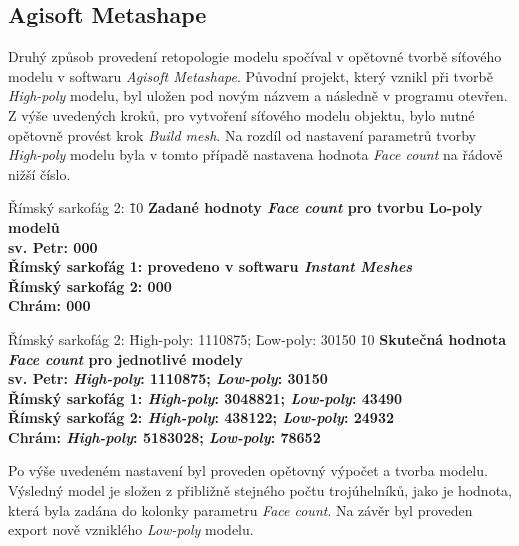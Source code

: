 \documentclass[a4paper, 12pt]{report}
\begin{document}
\subsection{Agisoft Metashape}
Druhý způsob provedení retopologie modelu spočíval v opětovné tvorbě síťového modelu v softwaru \textit{Agisoft Metashape}. Původní projekt, který vznikl při tvorbě \textit{High-poly} modelu, byl uložen pod novým názvem a následně v programu otevřen. Z výše uvedených kroků, pro vytvoření síťového modelu objektu, bylo nutné opětovně provést krok \textit{Build mesh}. Na rozdíl od nastavení parametrů tvorby \textit{High-poly} modelu byla v tomto případě nastavena hodnota \textit{Face count} na řádově nižší číslo. \\

\begin{tabbing}
    Římský sarkofág 2: \=      
    \= 10 \kill
    \bfseries Zadané hodnoty \textit{Face count} pro tvorbu Lo-poly modelů\> \\[1mm]
    sv. Petr:	 000\\
    Římský sarkofág 1:	\>	provedeno v softwaru \textit{Instant Meshes}\\
    Římský sarkofág 2:	 000\\
    Chrám:	 000\\
\end{tabbing}

\newpage
\begin{tabbing}
    Římský sarkofág 2: \=  High-poly: 1110875; \= Low-poly: 30150      
    \= 10 \kill
    \bfseries Skutečná hodnota \textit{Face count} pro jednotlivé modely\> \\[1mm]
    sv. Petr:	        \> \textit{High-poly}: 1110875;\> \textit{Low-poly}: 30150 \\
    Římský sarkofág 1:	\> \textit{High-poly}: 3048821;\> \textit{Low-poly}: 43490 \\
    Římský sarkofág 2:	\> \textit{High-poly}:  438122;\> \textit{Low-poly}: 24932 \\
    Chrám:	            \> \textit{High-poly}: 5183028;\> \textit{Low-poly}: 78652 \\
\end{tabbing}
Po výše uvedeném nastavení byl proveden opětovný výpočet a tvorba modelu. Výsledný model je složen z přibližně stejného počtu trojúhelníků, jako je hodnota, která byla zadána do kolonky parametru \textit{Face count}. Na závěr byl proveden export nově vzniklého \textit{Low-poly} modelu. 
\end{document}
